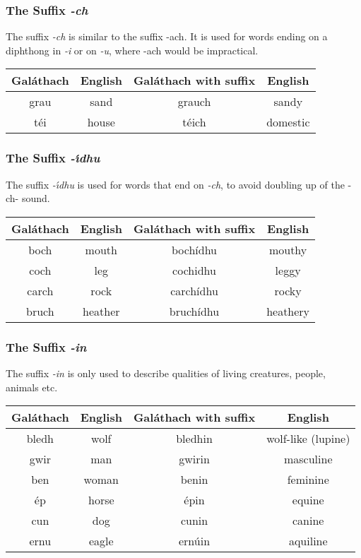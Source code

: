 \subsubsection{The Suffix \textit{-ch}}
The suffix \textit{-ch} is similar to the suffix -ach. It is used for words ending on a diphthong in \textit{-i} or on \textit{-u}, where -ach would be impractical.
\begin{table}[H]
\centering
\begin{tabu}{c|c|c|c}
  \textbf{Gal\'{a}thach} & \textbf{English} & \textbf{Gal\'{a}thach with suffix} & \textbf{English}\\
  \toprule
  grau & sand & grauch & sandy\\
  t\'{e}i & house & t\'{e}ich & domestic
\end{tabu}
\label{examples_suffix_ch}
\end{table}

\subsubsection{The Suffix \textit{-\'{\i}dhu}}

The suffix \textit{-\'{\i}dhu} is used for words that end on \textit{-ch}, to avoid doubling up of the -ch- sound.
\begin{table}[H]
\centering
\begin{tabu}{c|c|c|c}
  \textbf{Gal\'{a}thach} & \textbf{English} & \textbf{Gal\'{a}thach with suffix} & \textbf{English}\\
  \toprule
  boch & mouth & boch\'{i}dhu & mouthy\\
  coch & leg & cochidhu & leggy\\
  carch & rock & carch\'{i}dhu & rocky\\
  bruch & heather & bruch\'{i}dhu & heathery
\end{tabu}
\label{examples_suffix_iidhu}
\end{table}

\subsubsection{The Suffix \textit{-in}}

The suffix \textit{-in} is only used to describe qualities of living creatures, people, animals etc.
\begin{table}[H]
\centering
\begin{tabu}{c|c|c|c}
  \textbf{Gal\'{a}thach} & \textbf{English} & \textbf{Gal\'{a}thach with suffix} & \textbf{English}\\
  \toprule
  bledh & wolf & bledhin & wolf-like (lupine)\\
  gwir & man & gwirin & masculine\\
  ben & woman & benin & feminine\\
  \'{e}p & horse & \'{e}pin & equine\\
  cun & dog & cunin & canine\\
  ernu & eagle & ern\'{u}in & aquiline
\end{tabu}
\label{examples_suffix_in}
\end{table}

